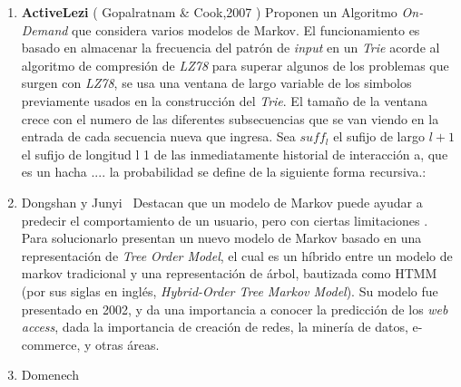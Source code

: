 \begin{enumerate}
{	%
	
	
	
	}
  \item \textbf{ActiveLezi} ( Gopalratnam \& Cook,2007 \etal\cite{Gopalratnam2007}) 
  {  
  Proponen un Algoritmo \emph{On-Demand} que considera varios modelos de Markov.  
  El funcionamiento es basado en almacenar la frecuencia del patrón de \emph{input} en un \emph{Trie} acorde al algoritmo de compresión de \emph{LZ78} para superar algunos de los problemas que surgen con \emph{LZ78}, se usa una ventana de largo variable de los simbolos previamente usados en la construcción del \emph{Trie}. El tamaño de la ventana crece con el numero de las diferentes subsecuencias que se van viendo en la entrada de cada secuencia nueva que ingresa.  Sea $suff_{l}$  el sufijo de largo $l+1$ el sufijo de longitud l 1 de las inmediatamente historial de interacción a, que es un hacha .... la probabilidad se define de la siguiente forma recursiva.:
 }



  \item Dongshan y Junyi~\cite{Dongshan2002} 
  {
	  Destacan que un modelo de Markov puede ayudar a predecir el comportamiento de un usuario, pero con ciertas limitaciones .  Para solucionarlo presentan un nuevo modelo de Markov basado en una representación de \emph{Tree Order Model}, el cual es un híbrido entre un modelo de markov tradicional y una representación de árbol, bautizada como HTMM (por sus siglas en inglés, \emph{Hybrid-Order Tree Markov Model}).
	  Su modelo fue presentado en 2002, y da una importancia a conocer la predicción de los \emph{web access}, dada la importancia de creación de redes, la minería de datos, e-commerce, y otras áreas.
	}
  \item Domenech \etal~\cite{Domenech2006}
  

\end{enumerate}
